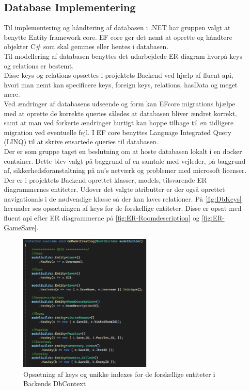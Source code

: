 \subsection{Database Implementering}
\label{Section: DB-Implementering}
Til implementering og håndtering af databasen i .NET har gruppen valgt at benytte Entity framework core.
EF core gør det nemt at oprette og håndtere objekter C\# som skal gemmes eller hentes i databasen.\\
Til modellering af databasen benyttes det udarbejdede ER-diagram hvorpå keys og relations er bestemt.\\
Disse keys og relations opsættes i projektets Backend ved hjælp af fluent api, hvori man nemt kan specificere keys, foreign keys, relations, hasData og meget mere.\\
Ved ændringer af databasens udseende og form kan EFcore migrations hjælpe med at oprette de korrekte queries således at databasen bliver ændret korrekt, samt at man ved forkerte ændringer hurtigt kan hoppe tilbage til en tidligere migration ved eventuelle fejl. I EF core benyttes Language Integrated Query (LINQ) til at skrive ensartede queries til databasen.\\
Der er som gruppe taget en beslutning om at hoste databasen lokalt i en docker container. Dette blev valgt på baggrund af en samtale med vejleder, på baggrund af, sikkerhedsforanstaltning på au’s netværk og problemer med microsoft licenser.\\

\noindent Der er i projektets Backend oprettet klasser, models, tilsvarende ER diagrammernes entiteter. Udover det valgte atributter er der også oprettet navigationals i de nødvendige klasse så der kan laves relationer.
På \autoref{fig:DbKeys} herunder ses opsætningen af keys for de forskellige entiteter. Disse er opsat med fluent api efter ER diagrammerne på \autoref{fig:ER-Roomdescription} og \autoref{fig:ER-GameSave}.

\begin{figure}[H]
\centering
\includegraphics[width = 0.6\textwidth]{02-Body/Images/DAL-Database/DbKeys.PNG}
\caption{Opsætning af keys og unikke indexes for de forskellige entiteter i Backends DbContext}
\label{fig:DbKeys}
\end{figure}

